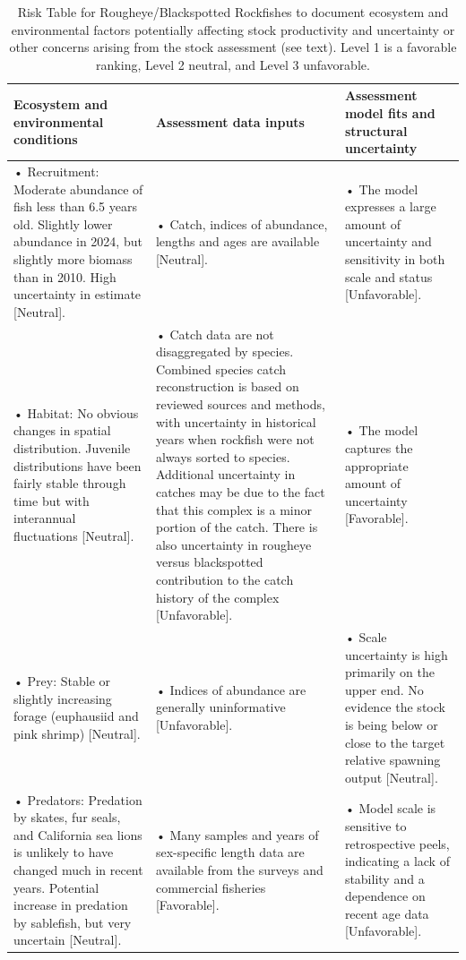 \documentclass[
]{scrartcl}
\begin{document}
\begin{longtable}{>{\raggedright\arraybackslash}p{\dimexpr 150.00pt -2\tabcolsep-1.5\arrayrulewidth}>{\raggedright\arraybackslash}p{\dimexpr 150.00pt -2\tabcolsep-1.5\arrayrulewidth}>{\raggedright\arraybackslash}p{\dimexpr 150.00pt -2\tabcolsep-1.5\arrayrulewidth}}

\caption{\label{tbl-risk}Risk Table for Rougheye/Blackspotted Rockfishes
to document ecosystem and environmental factors potentially affecting
stock productivity and uncertainty or other concerns arising from the
stock assessment (see text). Level 1 is a favorable ranking, Level 2
neutral, and Level 3 unfavorable.}

\tabularnewline

\toprule
Ecosystem and environmental conditions & Assessment data inputs & Assessment model fits and structural uncertainty \\ 
\midrule\addlinespace[2.5pt]
• Recruitment: Moderate abundance of fish less than 6.5 years old. Slightly lower abundance in 2024, but slightly more biomass than in 2010. High uncertainty in estimate [Neutral]. & • Catch, indices of abundance, lengths and ages are available [Neutral]. & • The model expresses a large amount of uncertainty and sensitivity in both scale and status [Unfavorable]. \\ 
• Habitat: No obvious changes in spatial distribution. Juvenile distributions have been fairly stable through time but with interannual fluctuations [Neutral]. & • Catch data are not disaggregated by species. Combined species catch reconstruction is based on reviewed sources and methods, with uncertainty in historical years when rockfish were not always sorted to species. Additional uncertainty in catches may be due to the fact that this complex is a minor portion of the catch. There is also uncertainty in rougheye versus blackspotted contribution to the catch history of the complex [Unfavorable]. & • The model captures the appropriate amount of uncertainty [Favorable]. \\ 
• Prey: Stable or slightly increasing forage (euphausiid and pink shrimp) [Neutral]. & • Indices of abundance are generally uninformative [Unfavorable]. & • Scale uncertainty is high primarily on the upper end. No evidence the stock is being below or close to the target relative spawning output [Neutral]. \\ 
• Predators: Predation by skates, fur seals, and California sea lions is unlikely to have changed much in recent years. Potential increase in predation by sablefish, but very uncertain [Neutral]. & • Many samples and years of sex-specific length data are available from the surveys and commercial fisheries [Favorable]. & • Model scale is sensitive to retrospective peels, indicating a lack of stability and a dependence on recent age data [Unfavorable]. \\ 

\end{longtable}
\end{document}
